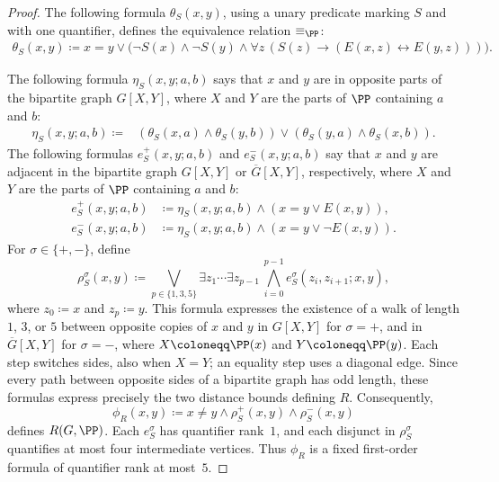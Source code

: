 \begin{proof}
    The following formula $\theta_S(x,y)$, using a unary predicate marking $S$ and with one quantifier,  defines the equivalence relation $\equiv_\PP$:
    \begin{align}\label{eq:definableEquiv}
        \theta_S(x,y) \coloneqq
        x = y \lor \bigl(\neg S(x) \land \neg S(y) \land
        \forall z\,(S(z) \to (E(x,z) \leftrightarrow E(y,z)))\bigr).
    \end{align}

  The following formula $\eta_S(x,y;a,b)$ says that $x$ and $y$ are in opposite parts of the bipartite graph $G[X,Y]$, where $X$ and $Y$ are the parts of $\PP$ containing $a$ and $b$:
\begin{align*}
  \eta_S(x,y;a,b)\coloneqq{}&
  (\theta_S(x,a)\land\theta_S(y,b))
  \lor(\theta_S(y,a)\land\theta_S(x,b)).
\end{align*}
The following formulas $e_S^+(x,y;a,b)$ and $e_S^-(x,y;a,b)$
 say that $x$ and $y$ are adjacent in the bipartite graph $G[X,Y]$ or $\overline G[X,Y]$, respectively, where $X$ and $Y$ are the parts of $\PP$ containing $a$ and $b$:
\begin{align*}
  e_S^+(x,y;a,b)&\coloneqq \eta_S(x,y;a,b)\land(x=y\lor E(x,y)),\\
  e_S^-(x,y;a,b)&\coloneqq \eta_S(x,y;a,b)\land(x=y\lor \neg E(x,y)).
\end{align*}
For $\sigma\in\{+,-\}$, define
\[
  \rho_S^\sigma(x,y)\coloneqq
  \bigvee_{p\in\{1,3,5\}}
  \exists z_1\cdots\exists z_{p-1}\,
  \bigwedge_{i=0}^{p-1}e_S^\sigma(z_i,z_{i+1};x,y),
\]
where $z_0\coloneqq x$ and $z_p\coloneqq y$.
This formula expresses the existence of a walk of length $1$, $3$, or $5$
between opposite copies of $x$ and $y$ in $G[X,Y]$ for $\sigma=+$, and
in $\overline G[X,Y]$ for $\sigma=-$, where $X\coloneqq \PP(x)$ and $Y\coloneqq \PP(y)$.
Each step switches sides, also when $X=Y$; an equality step uses a diagonal edge.
Since every path between opposite sides of a bipartite graph has odd length,
these formulas express precisely the two distance bounds defining $R$.
Consequently,
\[
  \phi_R(x,y)\coloneqq
  x\ne y\land\rho_S^+(x,y)\land\rho_S^-(x,y)
\]
defines $R(G,\PP)$.
Each $e_S^\sigma$ has quantifier rank~$1$, and each disjunct in
$\rho_S^\sigma$ quantifies at most four intermediate vertices.
Thus $\phi_R$ is a fixed first-order formula of quantifier rank at most~$5$.
\end{proof}


